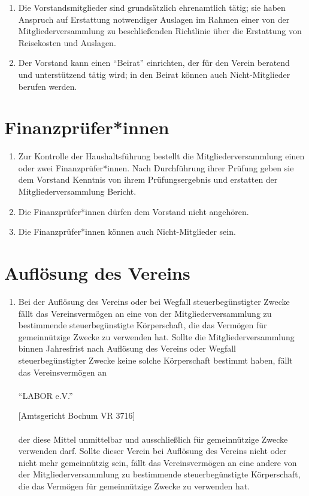 \documentclass[a4paper]{article}
\begin{document}
\begin{enumerate}
	\item Die Vorstandsmitglieder sind grundsätzlich ehrenamtlich tätig; sie haben Anspruch auf Erstattung notwendiger Auslagen im Rahmen einer von der Mitgliederversammlung zu beschließenden Richtlinie über die Erstattung von Reisekosten und Auslagen.

	\item Der Vorstand kann einen \enquote{Beirat} einrichten, der für den Verein beratend und unterstützend tätig wird; in den Beirat können auch Nicht-Mitglieder berufen werden.

\end{enumerate}

\section{Finanzprüfer*innen}
\begin{enumerate}
	\item Zur Kontrolle der Haushaltsführung bestellt die Mitgliederversammlung einen oder zwei Finanzprüfer*innen. Nach Durchführung ihrer Prüfung geben sie dem Vorstand Kenntnis von ihrem Prüfungsergebnis und erstatten der Mitgliederversammlung Bericht.
	\item Die Finanzprüfer*innen dürfen dem Vorstand nicht angehören.
	\item Die Finanzprüfer*innen können auch Nicht-Mitglieder sein.
\end{enumerate}

\filbreak
\section{Auflösung des Vereins}
\begin{enumerate}
	\item Bei der Auflösung des Vereins oder bei Wegfall steuerbegünstigter Zwecke fällt das Vereinsvermögen an eine von der Mitgliederversammlung zu bestimmende steuerbegünstigte Körperschaft, die das Vermögen für gemeinnützige Zwecke zu verwenden hat. Sollte die Mitgliederversammlung binnen Jahresfrist nach Auflösung des Vereins oder Wegfall steuerbegünstigter Zwecke keine solche Körperschaft bestimmt haben, fällt das Vereinsvermögen an
	 \\
	 \\
	\enquote{LABOR e.V.}

	[Amtsgericht Bochum VR 3716]
	\\
	\\
	der diese Mittel unmittelbar und ausschließlich für gemeinnützige Zwecke verwenden darf. Sollte dieser Verein bei Auflösung des Vereins nicht oder nicht mehr gemeinnützig sein, fällt das Vereinsvermögen an eine andere von der Mitgliederversammlung zu bestimmende steuerbegünstigte Körperschaft, die das Vermögen für gemeinnützige Zwecke zu verwenden hat.
\end{enumerate}
\end{document}
